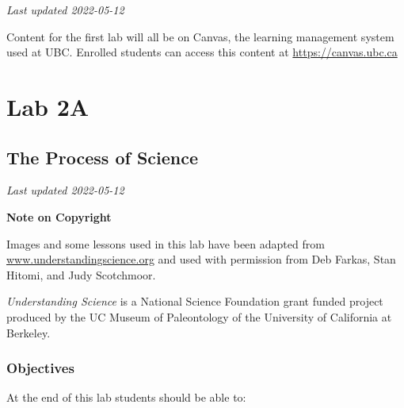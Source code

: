 \documentclass[
]{book}
\begin{document}
\emph{Last updated 2022-05-12}

Content for the first lab will all be on Canvas, the learning management system used at UBC. Enrolled students can access this content at \url{https://canvas.ubc.ca}

\hypertarget{part-lab-2a}{%
\part*{Lab 2A}\label{part-lab-2a}}

\hypertarget{the-process-of-science}{%
\chapter*{The Process of Science}\label{the-process-of-science}}

\emph{Last updated 2022-05-12}

\textbf{Note on Copyright}

Images and some lessons used in this lab have been adapted from \href{http://www.understandingscience.org/}{www.understandingscience.org} and used with permission from Deb Farkas, Stan Hitomi, and Judy Scotchmoor.

\emph{Understanding Science} is a National Science Foundation grant funded project produced by the UC Museum of Paleontology of the University of California at Berkeley.

\hypertarget{objectives}{%
\section*{Objectives}\label{objectives}}

At the end of this lab students should be able to:
\end{document}
